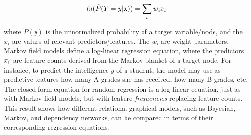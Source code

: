 \documentclass[twoside,leqno,twocolumn]{article}
\begin{document}
$$ln(\tilde{P}(Y = y|\mathbf{x}))= \sum_{i} w_{i} x_{i}$$


where $\tilde{P}(y)$ is the unnormalized 
probability of a target variable/node, and the $x_{i}$ are values of relevant predictors/features. The $w_{i}$ are weight parameters. %
Markov field models 
define a log-linear regression equation, 
where the predictors $x_{i}$ are feature counts derived from the Markov blanket of a target node.  For instance, to predict the intelligence $y$ of a student, the model may use as predictive features how many A grades she has received, how many B grades, etc. The closed-form equation for random regression is a log-linear equation, just as with Markov field models, but with feature {\em frequencies} replacing feature counts. This result shows how different relational graphical models, such as Bayesian, Markov, and dependency networks, can be compared in terms of their corresponding regression equations.
\end{document}
